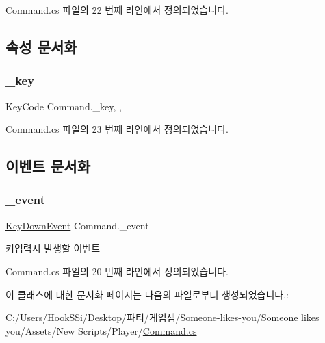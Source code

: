 Command.\+cs 파일의 22 번째 라인에서 정의되었습니다.



\subsection{속성 문서화}
\mbox{\label{class_command_a85e9adc5f9994f8da6b21bbad6dfb13d}} 
\subsubsection{\texorpdfstring{\_key}{\_key}}
{\footnotesize\ttfamily Key\+Code Command.\+\_\+key\hspace{0.3cm}{\ttfamily [get]}, {\ttfamily [set]}, {\ttfamily [private]}}



Command.\+cs 파일의 23 번째 라인에서 정의되었습니다.


\begin{DoxyCode}{0}

\end{DoxyCode}


\subsection{이벤트 문서화}
\mbox{\label{class_command_a04f1a7e0dc8e999e0fca2aa9210f73a3}} 
\subsubsection{\texorpdfstring{\_event}{\_event}}
{\footnotesize\ttfamily \mbox{\hyperlink{class_command_acc714b5e0de57b7f24b2619fff860b9d}{Key\+Down\+Event}} Command.\+\_\+event}



키입력시 발생할 이벤트 



Command.\+cs 파일의 20 번째 라인에서 정의되었습니다.



이 클래스에 대한 문서화 페이지는 다음의 파일로부터 생성되었습니다.\+:\begin{DoxyCompactItemize}
\item 
C\+:/\+Users/\+Hook\+S\+Si/\+Desktop/파티/게임잼/\+Someone-\/likes-\/you/\+Someone likes you/\+Assets/\+New Scripts/\+Player/\mbox{\hyperlink{_command_8cs}{Command.\+cs}}\end{DoxyCompactItemize}
